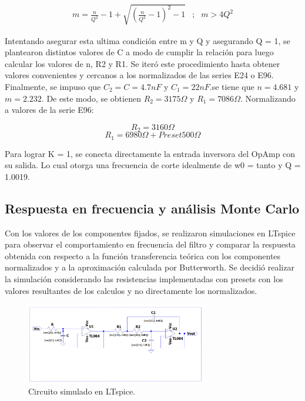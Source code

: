 \begin{equation}
\begin{matrix}
m = \frac{n}{Q^{2}} - 1 + \sqrt{(\frac{n}{Q^{2}} - 1)^{2} - 1} & ; & m > 4Q^{2}
\end{matrix}
    \label{eq:SK14}
\end{equation}

Intentando asegurar esta ultima condición entre m y Q y asegurando Q = 1, se plantearon distintos valores de C a modo de cumplir la relación para luego calcular los valores de n, R2 y R1. Se iteró este procedimiento hasta obtener valores convenientes y cercanos a los normalizados de las series E24 o E96. Finalmente, se impuso que $C_{2} = C = 4.7nF$ y $C_{1} = 22nF$.se tiene que $n = 4.681$ y $m = 2.232$. De este modo, se obtienen $R_{2} = 3175 \Omega$ y $R_{1} = 7086 \Omega$. Normalizando a valores de la serie E96:

$$R_{2} = 3160 \Omega$$
$$R_{1} = 6980 \Omega + Preset 500 \Omega$$

Para lograr K = 1, se conecta directamente la entrada inversora del OpAmp con su salida. Lo cual otorga una frecuencia de corte idealmente de w0 = tanto y Q = 1.0019. 



\subsection{Respuesta en frecuencia y análisis Monte Carlo}

Con los valores de los componentes fijados, se realizaron simulaciones en LTspice para observar el comportamiento en frecuencia del filtro y comparar la respuesta obtenida con respecto a la función transferencia teórica con los componentes normalizados y a la aproximación calculada por Butterworth. Se decidió realizar la simulación considerando las resistencias implementadas con presets con los valores resultantes de los calculos y no directamente los normalizados. 

\begin{figure}[H]
    \centering
    \includegraphics[width= 0.7\textwidth]{../Ejercicio2-DisenoDeCeldas/1CeldaSallenKey/images/circLTspiceSK.png}
    \caption{Circuito simulado en LTspice.}
    \label{fig:simuSK}
\end{figure}

